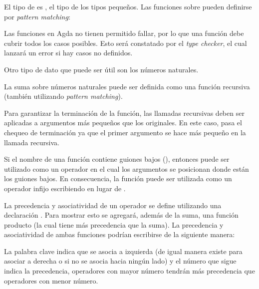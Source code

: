 
El tipo de  es , el tipo de los tipos pequeños. Las funciones sobre  pueden definirse por \textit{pattern matching}:


Las funciones en Agda no tienen permitido fallar, por lo que una función debe cubrir todos los casos posibles. Esto será constatado por el \textit{type checker}, el cual lanzará un error si hay casos no definidos. 

Otro tipo de dato que puede ser útil son los números naturales. 


La suma sobre números naturales puede ser definida como una función recursiva (también utilizando \textit{pattern matching}). 


Para garantizar la terminación de la función, las llamadas recursivas deben ser aplicadas a argumentos más pequeños que los originales. En este caso, \AgdaFunction{\_+\_} pasa el chequeo de terminación ya que el primer argumento se hace más pequeño en la llamada recursiva. 

Si el nombre de una función contiene guiones bajos (\AgdaSymbol{\_}), entonces puede ser utilizado como un operador en el cual los argumentos se posicionan donde están los guiones bajos. En consecuencia, la función \AgdaFunction{\_+\_} puede ser utilizada como un operador infijo escribiendo  \AgdaFunction{+}  en lugar de \AgdaFunction{\_+\_} . 

La precedencia y asociatividad de un operador se define utilizando una declaración . Para mostrar esto se agregará, además de la suma, una función producto (la cual tiene más precedencia que la suma). La precedencia y asociatividad de ambas funciones podrían escribirse de la siguiente manera:


La palabra clave  indica que se asocia a izquierda (de igual manera existe  para asociar a derecha o  si no se asocia hacia ningún lado) y el número que sigue indica la precedencia, operadores con mayor número tendrán más precedencia que operadores con menor número.

